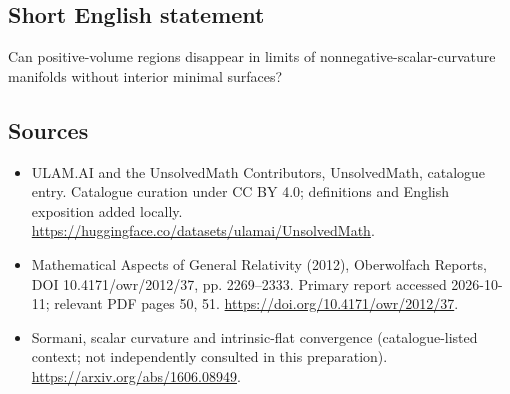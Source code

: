 \documentclass[11pt]{article}
\begin{document}
\subsection{Short English statement}
Can positive-volume regions disappear in limits of nonnegative-scalar-curvature manifolds without interior minimal surfaces?
\subsection{Sources}
\begin{itemize}
\item[\hypertarget{source:statement:1}{S1}] ULAM.AI and the UnsolvedMath Contributors, UnsolvedMath, catalogue entry. Catalogue curation under CC BY 4.0; definitions and English exposition added locally.
\url{https://huggingface.co/datasets/ulamai/UnsolvedMath}.
\item[\hypertarget{source:statement:2}{S2}] Mathematical Aspects of General Relativity (2012), Oberwolfach Reports, DOI 10.4171/owr/2012/37, pp. 2269--2333. Primary report accessed 2026-10-11; relevant PDF pages 50, 51.
\url{https://doi.org/10.4171/owr/2012/37}.
\item[\hypertarget{source:statement:3}{S3}] Sormani, scalar curvature and intrinsic-flat convergence (catalogue-listed context; not independently consulted in this preparation).
\url{https://arxiv.org/abs/1606.08949}.
\end{itemize}
\label{end:statement}
\end{document}
